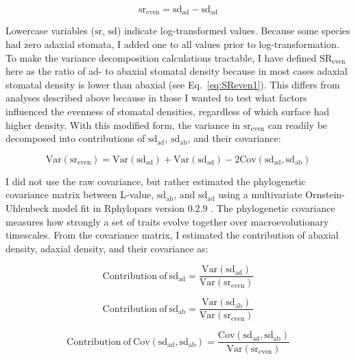 \documentclass[12pt, oneside]{article}
\newcommand{\pkg}[1]{{\fontseries{b}\selectfont #1}}
\newcommand{\el}{L-value}
\begin{document}
\begin{equation} \label{eq:SReven3} 
  \mathrm{sr_{even}} = \mathrm{sd_{ad}} - \mathrm{sd_{ad}}
\end{equation}

Lowercase variables ($\mathrm{sr}$, $\mathrm{sd}$) indicate log-transformed values. Because some species had zero adaxial stomata, I added one to all values prior to log-transformation. To make the variance decomposition calculations tractable, I have defined $\mathrm{SR_{even}}$ here as the ratio of ad- to abaxial stomatal density because in most cases adaxial stomatal density is lower than abaxial (see Eq.~\ref{eq:SReven1}). This differs from analyses described above because in those I wanted to test what factors influenced the evenness of stomatal densities, regardless of which surface had higher density. With this modified form, the variance in $\mathrm{sr_{even}}$ can readily be decomposed into contributions of $\mathrm{sd_{ad}}$, $\mathrm{sd_{ab}}$, and their covariance:

\begin{equation} \label{eq:varDecomp}
	\mathrm{Var(sr_{even})} = \mathrm{Var(sd_{ad})} + \mathrm{Var(sd_{ad})} - 2 \mathrm{Cov(sd_{ad}, sd_{ab})}
\end{equation}

I did not use the raw covariance, but rather estimated the phylogenetic covariance matrix between \el, $\mathrm{sd_{ab}}$, and $\mathrm{sd_{ad}}$ using a multivariate Ornstein-Uhlenbeck model fit in \pkg{Rphylopars} version 0.2.9 \citep{Goolsby_etal_2016, Goolsby_etal_2017}. The phylogenetic covariance measures how strongly a set of traits evolve together over macroevolutionary timescales. From the covariance matrix, I estimated the contribution of abaxial density, adaxial density, and their covariance as:

\begin{equation} \label{eq:contribution_ad}
	\mathrm{Contribution~of~sd_{ad}} = \frac{\mathrm{Var(sd_{ad})}}{\mathrm{Var(sr_{even})}}
\end{equation}

\begin{equation} \label{eq:contribution_ab}
 \mathrm{Contribution~of~sd_{ab}} = \frac{\mathrm{Var(sd_{ab})}}{\mathrm{Var(sr_{even})}}
\end{equation}

\begin{equation} \label{eq:contribution_cov}
 \mathrm{Contribution~of~Cov(sd_{ad}, sd_{ab})} = \frac{\mathrm{Cov(sd_{ad}, sd_{ab})}}{\mathrm{Var(sr_{even})}}
\end{equation}
\end{document}
